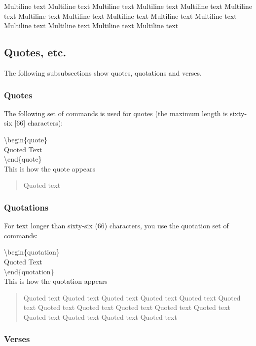 \documentclass[12pt]{MUNThesisBibTeX}
\begin{document}
\medskip

\begin{center} %
{\parbox{5cm}
{Multiline text Multiline text Multiline text Multiline text Multiline text Multiline text Multiline text Multiline text Multiline text Multiline text Multiline text Multiline text Multiline text Multiline text Multiline text}}
\end{center}

\subsection{Quotes, etc.}

The following subsubsections show quotes, quotations and verses.

\subsubsection{Quotes}

The following set of commands is used for quotes (the maximum length is sixty-six [66] characters):

\textbackslash begin\{quote\}\\
Quoted Text\\
\textbackslash end\{quote\}\\

This is how the quote appears \begin{quote}Quoted text\end{quote}

\subsubsection{Quotations}
For text longer than sixty-six (66) characters, you use the quotation set of commands:

\textbackslash begin\{quotation\}\\
Quoted Text\\
\textbackslash end\{quotation\}\\

This is how the quotation appears\begin{quotation}Quoted text Quoted text Quoted text Quoted text Quoted text Quoted text Quoted text Quoted text Quoted text Quoted text Quoted text Quoted text Quoted text Quoted text Quoted text\end{quotation}

\subsubsection{Verses}
\end{document}
